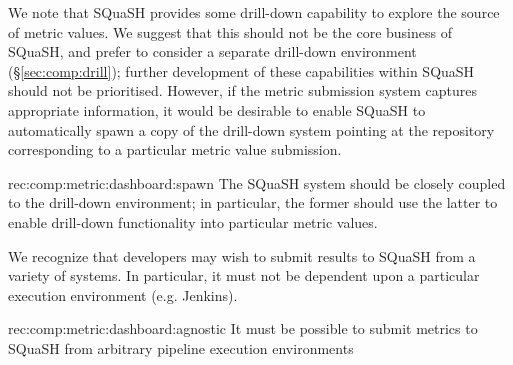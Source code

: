 We note that SQuaSH provides some drill-down capability to explore the source of metric values.
We suggest that this should not be the core business of SQuaSH, and prefer to consider a separate drill-down environment (\S\ref{sec:comp:drill}); further development of these capabilities within SQuaSH should not be prioritised.
However, if the metric submission system captures appropriate information, it would be desirable to enable SQuaSH to automatically spawn a copy of the drill-down system pointing at the repository corresponding to a particular metric value submission.

\begin{recommendation}
  {rec:comp:metric:dashboard:spawn}
  {The SQuaSH system should be closely coupled to the drill-down environment; in particular, the former should use the latter to enable drill-down functionality into particular metric values.}
\end{recommendation}

We recognize that developers may wish to submit results to SQuaSH from a variety of systems.
In particular, it must not be dependent upon a particular execution environment (e.g. Jenkins).

\begin{recommendation}
    {rec:comp:metric:dashboard:agnostic}
    {It must be possible to submit metrics to SQuaSH from arbitrary pipeline execution environments}
\end{recommendation}
